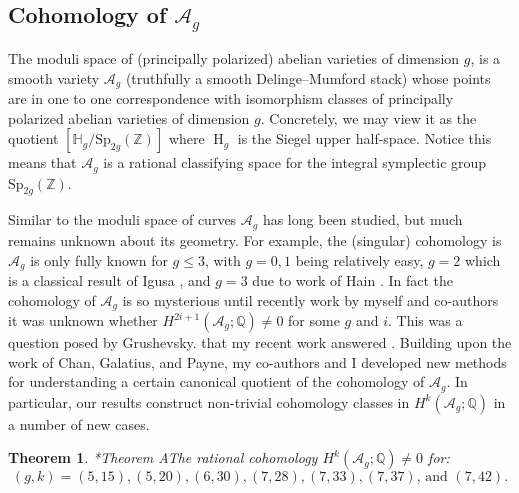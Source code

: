 \documentclass[11pt,reqno]{amsart}
\newtheorem{theorem}[lemma]{Theorem}
\theoremstyle{remark}
\renewcommand{\H}{\operatorname{H}}
\newcommand{\cA}{\mathcal{A}}
\newcommand{\cM}{\mathcal{M}}
\newcommand{\Q}{\mathbb{Q}}
\newcommand{\Z}{\mathbb{Z}}
\begin{document}





\subsection{Cohomology of $\cA_{g}$}

The moduli space of (principally polarized) abelian varieties of dimension $g$, is a smooth variety $\cA_{g}$ (truthfully a smooth Delinge--Mumford stack) whose points are in one to one correspondence with isomorphism classes of principally polarized abelian varieties of dimension $g$. Concretely, we may view it as the quotient $[\mathbb{H}_g/\mathrm{Sp}_{2g}(\Z)]$ where $\H_{g}$ is the Siegel upper half-space. Notice this means that $\cA_{g}$  is a rational classifying space for the integral symplectic group $\mathrm{Sp}_{2g}(\Z)$. 

Similar to the moduli space of curves $\cA_{g}$ has long been studied, but much remains unknown about its geometry. For example, the (singular) cohomology is $\cA_{g}$ is only fully known for $g\leq 3$, with $g=0,1$ being relatively easy, $g=2$ which is a classical result of Igusa \cite{igusa62}, and $g=3$ due to work of Hain \cite{hain02}. In fact the cohomology of $\cA_{g}$ is so mysterious until recently work by myself and co-authors it was unknown whether $H^{2i+1}(\cA_{g};\Q)\neq0$ for some $g$ and $i$. This was a question posed by Grushevsky. that my recent work answered \cite{grushevsky09}. Building upon the work of Chan, Galatius, and Payne, my co-authors and I developed new methods for understanding a certain canonical quotient of the cohomology of $\cA_{g}$. In particular, our results construct non-trivial cohomology classes in $H^{k}(\cA_{g}; \Q)$ in a number of new cases. 

\begin{theorem}\cite{BBCMMW22}*{Theorem A}\label{thm:Ag}
The rational cohomology $H^{k}\left(\cA_{g};\Q\right)\neq0$ for:
\[
\text{$(g,k)=(5,15),(5,20),(6,30),(7,28),(7,33),(7,37)$, and $(7,42)$}.
\]
\end{theorem}
\end{document}
